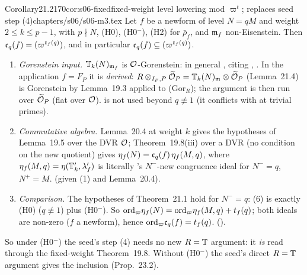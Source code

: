 \begin{quoted}{Corollary}{21.2}{170}{cor:s06-fixed}{fixed-weight level lowering mod $\varpi^t$; replaces seed step (4)}{chapters/s06/s06-m3.tex}\label{rpt:cor:s06-fixed}
Let $f$ be a newform of level $N=qM$ and weight $2\le k\le p-1$, with $p\nmid N$, (H0), (H0$^-$), (H2) for $\bar\rho_f$, and $\mathfrak{m}_f$ non-Eisenstein. Then $\mathfrak{c}_q(f)=(\varpi^{t_f(q)})$, and in particular $\mathfrak{c}_q(f)\subseteq(\varpi^{t_f(q)})$. \stpmc{}
\end{quoted}
\begin{outline}
\begin{enumerate}[label=(\arabic*)]
\item \emph{Gorenstein input.} $\mathbb{T}_k(N)_{\mathfrak{m}_f}$ is $\mathcal{O}$-Gorenstein: in general \cite[Prop.~5.1(1)]{KO}, citing \cite[Prop.~5.5]{Dim09},
  \stcited. In the application $f=F_P$ it is \emph{derived}: $R\otimes_{I_F,P}\widetilde{\mathcal{O}}_P=\mathbb{T}_k(N)_{\mathfrak{m}}\otimes\widetilde{\mathcal{O}}_P$ (Lemma~21.4) is
  Gorenstein by Lemma~19.3 applied to (Gor$_R$); the argument is then run over $\widetilde{\mathcal{O}}_P$ (flat over $\mathcal{O}$). \cite[Cor.~5.4]{KO} is
  not used beyond $q\not\equiv1$ (it conflicts with \cite{BKM} at trivial primes).
\item \emph{Commutative algebra.} Lemma~20.4 at weight $k$ gives the hypotheses of Lemma~19.5 over the DVR $\mathcal{O}$; Theorem~19.8(iii)
  over a DVR (no condition on the new quotient) gives $\eta_f(N)=\mathfrak{c}_q(f)\,\eta_f(M,q)$, where $\eta_f(M,q)=\eta(\mathbb{T}'_k,\lambda'_f)$ is literally
  \cite{KO}'s $N^-$-new congruence ideal \cite[Def.~2.11]{KO} for $N^-=q$, $N^+=M$. \stproved{} (given (1) and Lemma~20.4).
\item \emph{Comparison.} The hypotheses of Theorem~21.1 hold for $N^-=q$: (6) is exactly (H0) ($q\not\equiv1$) plus (H0$^-$). So
  $\mathrm{ord}_\varpi\eta_f(N)=\mathrm{ord}_\varpi\eta_f(M,q)+t_f(q)$; both ideals are non-zero ($f$ a newform), hence $\mathrm{ord}_\varpi\mathfrak{c}_q(f)=t_f(q)$.
  \stpmc{} (\cite[Thm~1.1]{KO}).
\end{enumerate}
So under (H0$^-$) the seed's step (4) needs no new $R=\mathbb{T}$ argument: it \emph{is} \cite[Thm~1.1]{KO} read through the fixed-weight
Theorem~19.8. Without (H0$^-$) the seed's direct $R=\mathbb{T}$ argument gives the inclusion (Prop.~23.2).
\end{outline}

